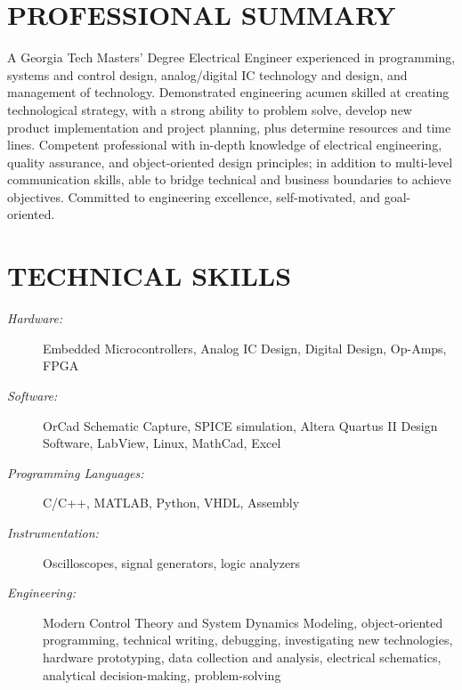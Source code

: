 \documentclass{res}
\begin{document}
 


\address{robert.savage3@gmail.com / (404)-434-3286 / \url{www.linkedin.com/in/robertmorgansavage/en}}


\begin{resume}

\section{PROFESSIONAL SUMMARY}          
    A Georgia Tech Masters' Degree Electrical Engineer experienced in programming, systems and control design, analog/digital IC technology and design, and management of technology.  Demonstrated engineering acumen skilled at creating technological strategy, with a strong ability to problem solve, develop new product implementation and project planning, plus determine resources and time lines.  Competent professional with in-depth knowledge of electrical engineering, quality assurance, and object-oriented design principles; in addition to multi-level communication skills, able to bridge technical and business boundaries to achieve objectives.  Committed to engineering excellence, self-motivated, and goal-oriented.    

\section{TECHNICAL SKILLS}
	\begin{description}
	 	\item[\textit{Hardware:}] Embedded Microcontrollers, Analog IC Design, Digital Design, Op-Amps, FPGA
   		\item [\textit{Software:}]  OrCad Schematic Capture, SPICE simulation, Altera Quartus II Design Software, LabView, Linux,  MathCad, Excel
   		\item[\textit{Programming Languages:}]C/C++, MATLAB, Python, VHDL, Assembly 
   		\item[\textit{Instrumentation:}] Oscilloscopes, signal generators, logic analyzers
   		\item[\textit{Engineering:}]  Modern Control Theory and System Dynamics Modeling, object-oriented programming, technical writing, debugging, investigating new technologies, hardware prototyping, data collection and analysis, electrical schematics, analytical decision-making, problem-solving    
    \end{description}
 

\end{resume}
\end{document}
